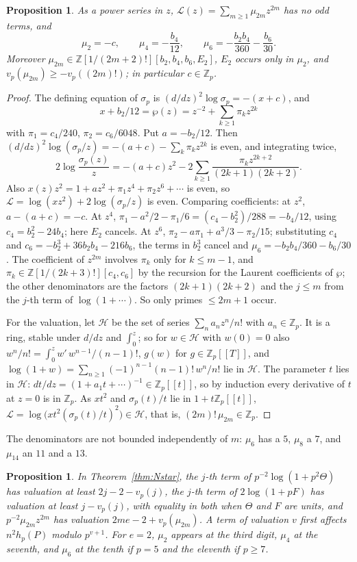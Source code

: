 \documentclass[11pt,a4paper]{amsart}
\newcommand{\Z}{\mathbb{Z}}
\newcommand{\Zp}{\mathbb{Z}_p}
\newcommand{\cL}{\mathcal{L}}
\theoremstyle{plain}
\newtheorem{proposition}[theorem]{Proposition}
\theoremstyle{definition}
\theoremstyle{remark}
\begin{document}
\begin{proposition}\label{prop:mu}
As a power series in $z$, $\cL(z)=\sum_{m\ge1}\mu_{2m}z^{2m}$ has no odd terms, and
\[
\mu_2=-c,\qquad \mu_4=-\frac{b_4}{12},\qquad \mu_6=-\frac{b_2b_4}{360}-\frac{b_6}{30}.
\]
Moreover $\mu_{2m}\in\Z[1/(2m+2)!][b_2,b_4,b_6,E_2]$, $E_2$ occurs only in $\mu_2$, and $v_p(\mu_{2m})\ge-v_p((2m)!)$; in particular $c\in\Zp$.
\end{proposition}

\begin{proof}
The defining equation of $\sigma_p$ is $(d/dz)^2\log\sigma_p=-(x+c)$, and \[x+b_2/12=\wp(z)=z^{-2}+\sum_{k\ge1}\pi_kz^{2k}\] with $\pi_1=c_4/240$, $\pi_2=c_6/6048$. Put $a=-b_2/12$. Then $(d/dz)^2\log(\sigma_p/z)=-(a+c)-\sum_k\pi_kz^{2k}$ is even, and integrating twice,
\[
2\log\frac{\sigma_p(z)}z=-(a+c)z^2-2\sum_{k\ge1}\frac{\pi_kz^{2k+2}}{(2k+1)(2k+2)} .
\]
Also $x(z)z^2=1+az^2+\pi_1z^4+\pi_2z^6+\cdots$ is even, so $\cL=\log(xz^2)+2\log(\sigma_p/z)$ is even. Comparing coefficients: at $z^2$, $a-(a+c)=-c$. At $z^4$, $\pi_1-a^2/2-\pi_1/6=(c_4-b_2^2)/288=-b_4/12$, using $c_4=b_2^2-24b_4$; here $E_2$ cancels. At $z^6$, $\pi_2-a\pi_1+a^3/3-\pi_2/15$; substituting $c_4$ and $c_6=-b_2^3+36b_2b_4-216b_6$, the terms in $b_2^3$ cancel and $\mu_6=-b_2b_4/360-b_6/30$. The coefficient of $z^{2m}$ involves $\pi_k$ only for $k\le m-1$, and $\pi_k\in\Z[1/(2k+3)!][c_4,c_6]$ by the recursion for the Laurent coefficients of $\wp$; the other denominators are the factors $(2k+1)(2k+2)$ and the $j\le m$ from the $j$-th term of $\log(1+\cdots)$. So only primes $\le2m+1$ occur.

For the valuation, let $\mathcal H$ be the set of series $\sum_na_nz^n/n!$ with $a_n\in\Zp$. It is a ring, stable under $d/dz$ and $\int_0^z$; so for $w\in\mathcal H$ with $w(0)=0$ also $w^n/n!=\int_0^zw'\,w^{n-1}/(n-1)!$, $g(w)$ for $g\in\Zp[[T]]$, and $\log(1+w)=\sum_{n\ge1}(-1)^{n-1}(n-1)!\,w^n/n!$ lie in $\mathcal H$. The parameter $t$ lies in $\mathcal H$: $dt/dz=(1+a_1t+\cdots)^{-1}\in\Zp[[t]]$, so by induction every derivative of $t$ at $z=0$ is in $\Zp$. As $xt^2$ and $\sigma_p(t)/t$ lie in $1+t\Zp[[t]]$, $\cL=\log\bigl(xt^2(\sigma_p(t)/t)^2\bigr)\in\mathcal H$, that is, $(2m)!\,\mu_{2m}\in\Zp$.
\end{proof}

The denominators are not bounded independently of $m$: $\mu_6$ has a $5$, $\mu_8$ a $7$, and $\mu_{14}$ an $11$ and a $13$.

\begin{proposition}\label{prop:digits}
In Theorem~\ref{thm:Nstar}, the $j$-th term of $p^{-2}\log(1+p^2\Theta)$ has valuation at least $2j-2-v_p(j)$, the $j$-th term of $2\log(1+pF)$ has valuation at least $j-v_p(j)$, with equality in both when $\Theta$ and $F$ are units, and $p^{-2}\mu_{2m}z^{2m}$ has valuation $2me-2+v_p(\mu_{2m})$. A term of valuation $v$ first affects $n^2h_p(P)$ modulo $p^{v+1}$. For $e=2$, $\mu_2$ appears at the third digit, $\mu_4$ at the seventh, and $\mu_6$ at the tenth if $p=5$ and the eleventh if $p\ge7$.
\end{proposition}
\end{document}
